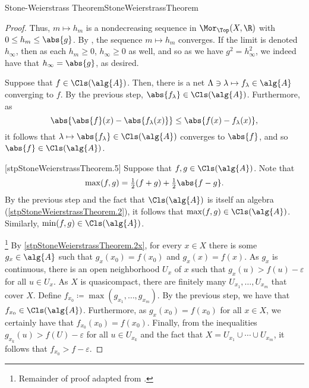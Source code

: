 \begin{thm}{Stone-Weierstrass Theorem}{StoneWeierstrassTheorem}
\begin{proof}
Thus, $m\mapsto h_m$ is a nondecreasing sequence in $\Mor _{\Top}(X,\R )$ with $0\leq h_m\leq \abs{g}$.  By , the sequence $m\mapsto h_m$ converges.  If the limit is denoted $h_{\infty}$, then as each $h_m\geq 0$, $h_{\infty}\geq 0$ as well, and so as we have $g^2=h_{\infty}^2$, we indeed have that $h_{\infty}=\abs{g}$, as desired.

Suppose that $f\in \Cls (\alg{A})$.  Then, there is a net $\Lambda \ni \lambda \mapsto f_{\lambda}\in \alg{A}$ converging to $f$.  By the previous step, $\abs{f_{\lambda}}\in \Cls (\alg{A})$.  Furthermore, as
\begin{equation}
\abs{\abs{f}(x)-\abs{f_{\lambda}(x)}}\leq \abs{f(x)-f_{\lambda}(x)},
\end{equation}
it follows that $\lambda \mapsto \abs{f_{\lambda}}\in \Cls (\alg{A})$ converges to $\abs{f}$, and so $\abs{f}\in \Cls (\alg{A})$.

[stpStoneWeierstrassTheorem.5]
Suppose that $f,g\in \Cls (\alg{A})$.  Note that
\begin{equation}
\max (f,g)=\tfrac{1}{2}(f+g)+\tfrac{1}{2}\abs{f-g}.
\end{equation}
By the previous step and the fact that $\Cls (\alg{A})$ is itself an algebra (\cref{stpStoneWeierstrassTheorem.2}), it follows that $\max (f,g)\in \Cls (\alg{A})$.  Similarly, $\min (f,g)\in \Cls (\alg{A})$.

\footnote{Remainder of proof adapted from \cite[Theorem 7.32]{Rudin}.}
By \cref{stpStoneWeierstrassTheorem.2x}, for every $x\in X$ there is some $g_x\in \alg{A}$ such that $g_x(x_0)=f(x_0)$ and $g_x(x)=f(x)$.  As $g_x$ is continuous, there is an open neighborhood $U_x$ of $x$ such that $g_x(u)>f(u)-\varepsilon$ for all $u\in U_x$.  As $X$ is quasicompact, there are finitely many $U_{x_1},\ldots ,U_{x_m}$ that cover $X$.  Define $f_{x_0}\coloneqq \max (g_{x_1},\ldots ,g_{x_m})$.  By the previous step, we have that $f_{x_0}\in \Cls (\alg{A})$.  Furthermore, as $g_x(x_0)=f(x_0)$ for all $x\in X$, we certainly have that $f_{x_0}(x_0)=f(x_0)$.  Finally, from the inequalities $g_{x_k}(u)>f(U)-\varepsilon$ for all $u\in U_{x_k}$ and the fact that $X=U_{x_1}\cup \cdots \cup U_{x_m}$, it follows that $f_{x_0}>f-\varepsilon$.


\end{proof}
\end{thm}
